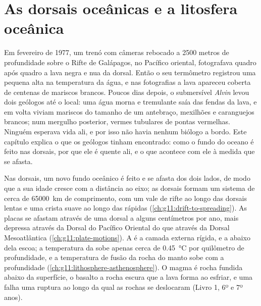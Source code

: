 \chapter{As dorsais oceânicas e a litosfera oceânica}\label{ch:g11:ocean-ridges}

Em fevereiro de 1977, um trenó com câmeras rebocado a 2500 metros de
profundidade sobre o Rifte de Galápagos, no Pacífico oriental, fotografava
quadro após quadro a lava negra e nua da dorsal. Então o seu termômetro
registrou uma pequena alta na temperatura da água, e nas fotografias a lava
apareceu coberta de centenas de mariscos brancos. Poucos dias depois, o
submersível \emph{Alvin} levou dois geólogos até o local: uma água morna e
tremulante saía das fendas da lava, e em volta viviam mariscos do tamanho de
um antebraço, mexilhões e caranguejos brancos; num mergulho posterior,
vermes tubulares de pontas vermelhas. Ninguém esperava vida ali, e por isso
não havia nenhum biólogo a bordo. Este capítulo explica o que os geólogos
tinham encontrado: como o fundo do oceano é feito nas dorsais, por que ele é
quente ali, e o que acontece com ele à medida que se afasta.

\begin{recall}
Nas dorsais, um novo fundo oceânico é feito e se afasta dos dois lados, de
modo que a sua idade cresce com a distância ao eixo; as dorsais formam um
sistema de cerca de \qty{65000}{km} de comprimento, com um vale de rifte ao
longo das dorsais lentas e uma crista suave ao longo das rápidas
(\cref{ch:g11:drift-to-spreading}). As placas se afastam através de uma
dorsal a alguns centímetros por ano, mais depressa através da Dorsal do
Pacífico Oriental do que através da Dorsal Mesoatlântica
(\cref{ch:g11:plate-motions}). A  é a camada externa rígida, e a
 abaixo dela escoa; a temperatura da  sobe apenas
cerca de \qty{0.45}{\celsius} por quilômetro de profundidade, e a
temperatura de fusão da rocha do manto sobe com a profundidade
(\cref{ch:g11:lithosphere-asthenosphere}). O magma é rocha fundida abaixo da
superfície, o basalto a rocha escura que a lava forma ao esfriar, e uma
falha uma ruptura ao longo da qual as rochas se deslocaram (Livro 1, 6º e
7º anos).
\end{recall}

